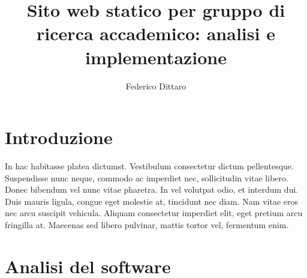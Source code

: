 \documentclass[target=bach,aauheader=]{thud}
\title{Sito web statico per gruppo di ricerca accademico: analisi e implementazione}
\author{Federico Dittaro}
\begin{document}
\maketitle

\begin{dedication}
	
\end{dedication}

\acknowledgements

\abstract

\tableofcontents



\mainmatter


\chapter{Introduzione}
In hac habitasse platea dictumst. Vestibulum consectetur dictum pellentesque. Suspendisse nunc neque, commodo ac imperdiet nec, sollicitudin vitae libero. Donec bibendum vel nunc vitae pharetra. In vel volutpat odio, et interdum dui. Duis mauris ligula, congue eget molestie at, tincidunt nec diam. Nam vitae eros nec arcu suscipit vehicula. Aliquam consectetur imperdiet elit, eget pretium arcu fringilla at. Maecenas \cite{Knu86} sed libero pulvinar, mattis tortor vel, fermentum enim.

\chapter{Analisi del software}

\end{document}
